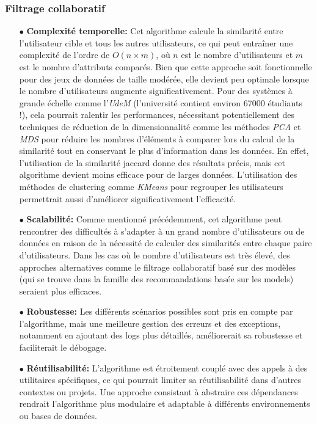 \documentclass[11pt]{article}
\begin{document}
\subsubsection{Filtrage collaboratif}
\begin{itemize}
	\item[$\bullet$] \textbf{Complexité temporelle:} Cet algorithme calcule la similarité entre l'utilisateur cible et tous les autres utilisateurs, ce qui peut entraîner une complexité de l'ordre de $O(n \times m)$, où $n$ est le nombre d'utilisateurs et $m$ est le nombre d'attributs comparés. Bien que cette approche soit fonctionnelle pour des jeux de données de taille modérée, elle devient peu optimale lorsque le nombre d'utilisateurs augmente significativement. Pour des systèmes à grande échelle comme l'\textit{UdeM} (l'université contient environ 67000 étudiants !), cela pourrait ralentir les performances, nécessitant potentiellement des techniques de réduction de la dimensionnalité comme les méthodes \textit{PCA} et \textit{MDS} pour réduire les nombres d'éléments à comparer lors du calcul de la similarité tout en conservant le plus d'information dans les données. En effet, l'utilisation de la similarité jaccard donne des résultats précis, mais cet algorithme devient moins efficace pour de larges données. L'utilisation des méthodes de clustering comme \textit{KMeans} pour regrouper les utilisateurs permettrait aussi d'améliorer significativement l'efficacité. \\
	
	\item[$\bullet$] \textbf{Scalabilité:} Comme mentionné précédemment, cet algorithme peut rencontrer des difficultés à s'adapter à un grand nombre d'utilisateurs ou de données en raison de la nécessité de calculer des similarités entre chaque paire d'utilisateurs. Dans les cas où le nombre d'utilisateurs est très élevé, des approches alternatives comme le filtrage collaboratif basé sur des modèles (qui se trouve dans la famille des recommandations basée sur les models) seraient plus efficaces.\\
	
	\item[$\bullet$] \textbf{Robustesse:} Les différents scénarios possibles sont pris en compte par l'algorithme, mais une meilleure gestion des erreurs et des exceptions, notamment en ajoutant des logs plus détaillés, améliorerait sa robustesse et faciliterait le débogage.\\
	
	\item[$\bullet$] \textbf{Réutilisabilité:} L'algorithme est étroitement couplé avec des appels à des utilitaires spécifiques, ce qui pourrait limiter sa réutilisabilité dans d'autres contextes ou projets. Une approche consistant à abstraire ces dépendances rendrait l'algorithme plus modulaire et adaptable à différents environnements ou bases de données.\\
	

\end{itemize}
\end{document}
